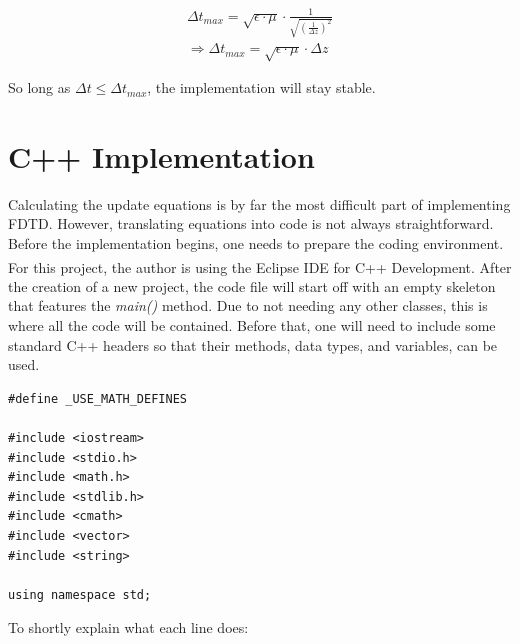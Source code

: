 \begin{align}
	\label{eqn:1DdeltaTMaxFinal}
	\Delta t_{max} = \sqrt{\epsilon \cdot \mu} \cdot \frac{1}{\sqrt{(\frac{1}{\Delta z})^2}} \\
	\Rightarrow \Delta t_{max} = \sqrt{\epsilon \cdot \mu} \cdot \Delta z
\end{align}

So long as $\Delta t \leq \Delta t_{max}$, the implementation will stay stable.


\section{C++ Implementation}

Calculating the update equations is by far the most difficult part of implementing FDTD. However, translating equations into code is not always straightforward. Before the implementation begins, one needs to prepare the coding environment. For this project, the author is using the Eclipse IDE for C++ Development\textsuperscript{\cite{eclipse}}. After the creation of a new project, the code file will start off with an empty skeleton that features the \textit{main()} method. Due to not needing any other classes, this is where all the code will be contained. Before that, one will need to include some standard C++ headers so that their methods, data types, and variables, can be used.

\begin{verbatim}
#define _USE_MATH_DEFINES
	
#include <iostream>
#include <stdio.h>
#include <math.h>
#include <stdlib.h>
#include <cmath>
#include <vector>
#include <string>

using namespace std;
\end{verbatim}

To shortly explain what each line does:

